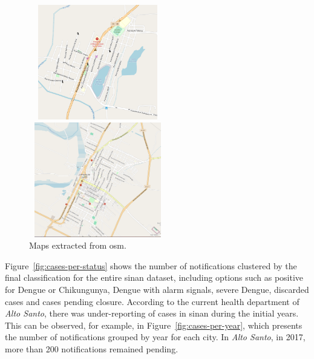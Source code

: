 \begin{figure}[h!]
\centering
  \begin{minipage}[c]{.45\textwidth}
    \includegraphics[width=6cm, height=5cm]{images/alto-santo-osm.png}
  \end{minipage}
  \hfill
  \begin{minipage}[c]{.45\textwidth}
  \includegraphics[width=6cm, height=5cm]{images/limoeiro-mapa.png}
  \end{minipage}
  \caption{\label{fig:graph-examples} Maps extracted from \gls{osm}.}
\end{figure}

Figure~\ref{fig:cases-per-status} shows the number of notifications clustered by the final classification for the entire \gls{sinan} dataset, including options such as positive for Dengue or Chikungunya, Dengue with alarm signals, severe Dengue, discarded cases and cases pending closure. According to the current health department of \textit{Alto Santo}, there was under-reporting of cases in \gls{sinan} during the initial years. This can be observed, for example, in Figure~\ref{fig:cases-per-year}, which presents the number of notifications grouped by year for each city. In \textit{Alto Santo}, in 2017, more than 200 notifications remained pending.

